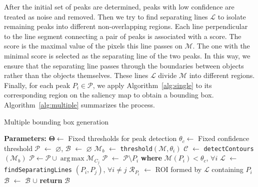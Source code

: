 \documentclass[10pt,twocolumn,letterpaper]{article}
\DeclareMathOperator*{\argmax}{arg\,max}
\let\emptyset\varnothing
\begin{document}
After the initial set of peaks are determined, peaks with low confidence are treated as noise and removed.
Then we try to find separating lines $\mathcal{L}$ to isolate remaining peaks into different non-overlapping regions.
Each line perpendicular to the line segment connecting a pair of peaks is associated with a score. The score is the maximal value of the pixels this line passes on $\mathcal{M}$. The one with the minimal score is selected as the separating line of the two peaks. In this way, we ensure that the separating line passes through the boundaries between objects rather than the objects themselves. 
These lines $\mathcal{L}$ divide $\mathcal{M}$ into different regions. 
Finally, for each peak $P_i \in \mathcal{P}$, we apply Algorithm~\ref{alg:single} to its corresponding region on the saliency map to obtain a bounding box.
Algorithm~\ref{alg:multiple} summarizes the process.
%
\begin{algorithm}[t]
\caption{Multiple bounding box generation}
\label{alg:multiple}
\begin{algorithmic}[1]
{\small
\Statex \textbf{Parameters:}
\Statex $\mathbf{\Theta} \gets $ Fixed thresholds for peak detection
\Statex $\theta_c \gets$ Fixed confidence threshold
\State $\mathcal{P}$ $\gets$ $\emptyset$, $\mathcal{B}$ $\gets$ $\emptyset$
			\State $\mathcal{M}_b$ $\gets$ \texttt{threshold}$(\mathcal{M}, \theta_i)$
      		\State $\mathcal{C}$ $\gets$ \texttt{detectContours}$(\mathcal{M}_b)$ 
      			\State $\mathcal{P} \gets \mathcal{P} \cup \argmax \mathcal{M}_{C_j}$
            \EndFor
  \EndFor
\EndWhile
\State $\mathcal{P}$ $\gets$ $\mathcal{P} \setminus P_i$ \textbf{where}  $\mathcal{M}(P_i) <\theta_c$, $\forall i$
\State $\mathcal{L}$ $\gets$ \texttt{findSeparatingLines} $(P_i,P_j)$, $\forall i\neq j$
\State $\mathcal{R}_{P_i}$ $\gets$  ROI formed by $\mathcal{L}$ containing $P_i$
\State $\mathcal{B}$ $\gets$ $\mathcal{B}$ $\cup$ 
\EndFor
\State \textbf{return} $\mathcal{B}$
\EndProcedure
}
\end{algorithmic}
\label{alg:train}
\end{algorithm}
\end{document}
